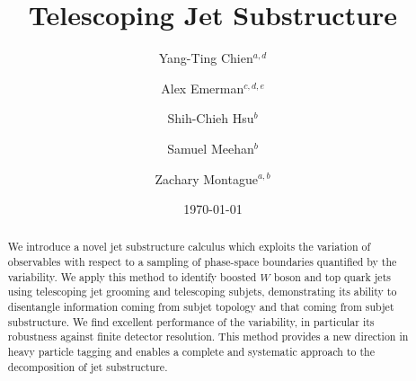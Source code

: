 \documentclass[aps,prl,floatfix,preprintnumbers,twocolumn,groupedaddress,nofootinbib]{revtex4-1}
\begin{document}
\title{Telescoping Jet Substructure}

\author{Yang-Ting Chien$^{a,d}$}

\author{Alex Emerman$^{c,d,e}$}

\author{Shih-Chieh Hsu$^b$}

\author{Samuel Meehan$^b$}

\author{Zachary Montague$^{a,b}$}


\date{\today}
\linenumbers

\begin{abstract}
We introduce a novel jet substructure calculus which exploits the variation of observables with respect to a sampling of phase-space boundaries quantified by the variability. We apply this method to identify boosted $W$ boson and top quark jets using telescoping jet grooming and telescoping subjets, demonstrating its ability to disentangle information coming from subjet topology and that coming from subjet substructure. We find excellent performance of the variability, in particular its robustness against finite detector resolution. This method provides a new direction in heavy particle tagging and enables a complete and systematic approach to the decomposition of jet substructure.
\end{abstract}
\maketitle
\end{document}
